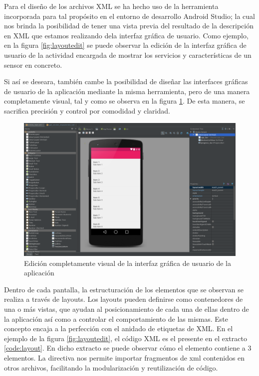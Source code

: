     Para el diseño de los archivos XML se ha hecho uso de la herramienta incorporada para tal propósito en el entorno de desarrollo Android Studio; la cual nos brinda la posibilidad de tener una vista previa del resultado de la descripción en XML que estamos realizando dela interfaz gráfica de usuario. Como ejemplo, en la figura \ref{fig:layoutedit} se puede observar la edición de la interfaz gráfica de usuario de la actividad encargada de mostrar los servicios y características de un sensor en concreto.

	Si así se deseara, también cambe la posibilidad de diseñar las interfaces gráficas de usuario de la aplicación mediante la misma herramienta, pero de una manera completamente visual, tal y como se observa en la figura \ref{fig:layoutvisual}. De esta manera, se sacrifica precisión y control por comodidad y claridad.

	\begin{figure}[h] \centering
	    \includegraphics[width=15cm]{graphs/layoutvisual.png} \caption{Edición completamente visual de la interfaz gráfica de usuario de la aplicación}\label{fig:layoutvisual}
	\end{figure}

	Dentro de cada pantalla, la estructuración de los elementos que se observan se realiza a través de layouts. Los layouts pueden definirse como contenedores de una o más vistas, que ayudan al posicionamiento de cada una de ellas dentro de la aplicación así como a controlar el comportamiento de las mismas. Este concepto encaja a la perfección con el anidado de etiquetas de XML. En el ejemplo de la figura \ref{fig:layoutedit}, el código XML es el presente en el extracto \ref{code:layout}. En dicho extracto se puede observar cómo el elemento  contiene a 3 elementos. La directiva  nos permite importar fragmentos de xml contenidos en otros archivos, facilitando la modularización y reutilización de código.
	
